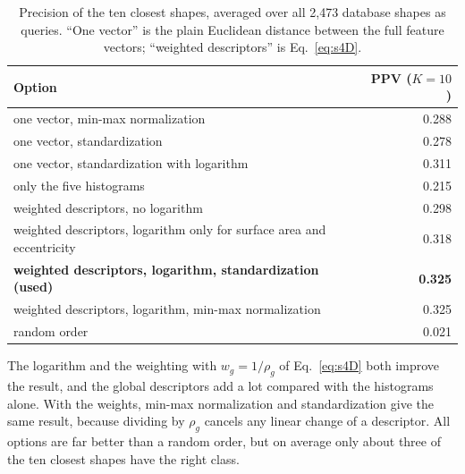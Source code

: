 \documentclass[10pt,a4paper]{article}
\begin{document}
\begin{table}[htbp]\centering\small
\begin{tabular}{@{}lr@{}}\toprule
Option & PPV ($K=10$)\\\midrule
one vector, min-max normalization & 0.288\\
one vector, standardization & 0.278\\
one vector, standardization with logarithm & 0.311\\
only the five histograms & 0.215\\
weighted descriptors, no logarithm & 0.298\\
weighted descriptors, logarithm only for surface area and eccentricity & 0.318\\
\textbf{weighted descriptors, logarithm, standardization (used)} & \textbf{0.325}\\
weighted descriptors, logarithm, min-max normalization & 0.325\\\midrule
random order & 0.021\\
\bottomrule\end{tabular}
\caption{Precision of the ten closest shapes, averaged over all 2,473 database shapes as queries. ``One vector'' is the plain
Euclidean distance between the full feature vectors; ``weighted descriptors'' is Eq.~\eqref{eq:s4D}.}
\label{tab:s4options}
\end{table}

The logarithm and the weighting with $w_g=1/\rho_g$ of Eq.~\eqref{eq:s4D} both improve the result, and the global descriptors add
a lot compared with the histograms alone.
With the weights, min-max normalization and standardization give the same result, because dividing by $\rho_g$ cancels any linear
change of a descriptor. All options are far better than a random order, but on average only about three of the ten closest shapes have
the right class.
\end{document}
